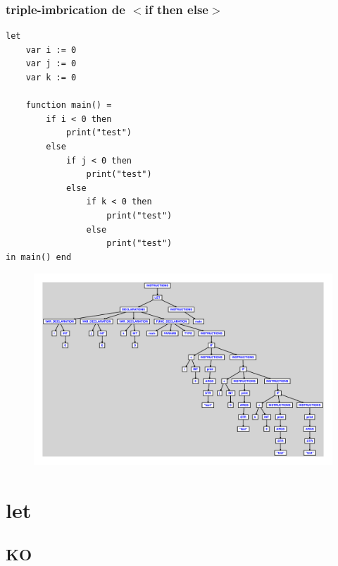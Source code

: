 \documentclass{article}
\begin{document}
\subsubsection{triple-imbrication de $ < $if then else$ > $}
\begin{lstlisting}
let
	var i := 0
	var j := 0
	var k := 0

	function main() =
		if i < 0 then
			print("test")
		else
			if j < 0 then
				print("test")
			else
				if k < 0 then
					print("test")
				else
					print("test")
in main() end
\end{lstlisting}
\newpage
\begin{figure}[H]
\centering
\includegraphics[max width=\textwidth]{ast/ast_266.pdf}
\end{figure}
\newpage
\section{let}
\subsection{KO}
\end{document}
